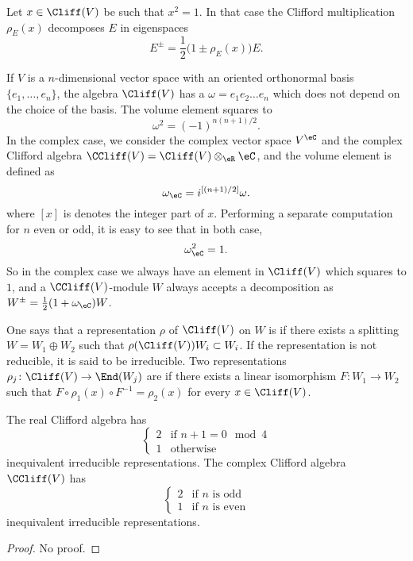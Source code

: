 Let $x\in\Cliff(V)$ be such that $x^2=1$. In that case the Clifford multiplication $\rho_E(x)$ decomposes $E$ in eigenspaces
\[ 
  E^{\pm}=\frac{ 1 }{2}\big( 1\pm\rho_E(x) \big)E.
\]

If $V$ is a $n$-dimensional vector space with an oriented orthonormal basis $\{ e_1,\ldots, e_n \}$, the algebra $\Cliff(V)$ has a  $\omega=e_1e_2\ldots e_n$ which does not depend on the choice of the basis. The volume element squares to
\begin{equation}
\omega^2=(-1)^{n(n+1)/2}.
\end{equation}
In the complex case, we consider the complex vector space $V^{\eC}$ and the complex Clifford algebra $\CCliff(V)=\Cliff(V)\otimes_{\eR}\eC$, and the volume element is defined as
\begin{equation}
\omega_{\eC}=i^{[ (n+1)/2 ]}\omega.
\end{equation}
where $[x]$ is denotes the integer part of $x$. Performing a separate computation for $n$ even or odd, it is easy to see that in both case,
\begin{equation}
\omega_{\eC}^2=1.
\end{equation}
So in the complex case we always have an element in $\Cliff(V)$ which squares to $1$, and a $\CCliff(V)$-module $W$ always accepts a decomposition as $W^{\pm}=\frac{ 1 }{2}(1+\omega_{\eC})W$.

One says that a representation $\rho$ of $\Cliff(V)$ on $W$ is  if there exists a splitting $W=W_1\oplus W_2$ such that $\rho(\Cliff(V))W_i\subset W_i$. If the representation is not reducible, it is said to be irreducible. Two representations $\rho_j\colon \Cliff(V)\to \End(W_j)$ are  if there exists a linear isomorphism $F\colon W_1\to W_2$ such that $F\circ\rho_1(x)\circ F^{-1}=\rho_2(x)$ for every $x\in\Cliff(V)$.

\begin{proposition}
The real Clifford algebra has
\[ 
 \begin{cases}
2&\text{if $n+1=0\mod 4$}\\
1&\text{otherwise}
\end{cases} 
\]
inequivalent irreducible representations. The complex Clifford algebra $\CCliff(V)$ has
\[ 
 \begin{cases}
2&\text{if $n$ is odd}\\
1&\text{if $n$ is even}
\end{cases} 
\]
inequivalent irreducible representations. 
\end{proposition}
\begin{proof}
No proof.
\end{proof}


